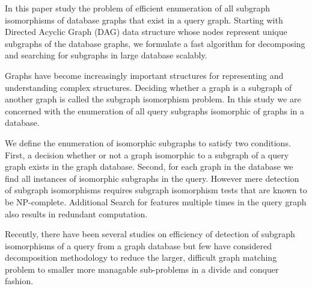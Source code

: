 
In this paper study the problem of efficient enumeration of all subgraph isomorphisms of database graphs that exist in a query graph. Starting with Directed Acyclic Graph (DAG) data structure whose nodes represent unique subgraphs of the database graphs, we formulate a fast algorithm for decomposing and searching for subgraphs in large database scalably.

Graphs have become increasingly important structures for representing and understanding complex structures. Deciding whether a graph is a subgraph of another graph is called the subgraph isomorphism problem. In this study we are concerned with the enumeration of all query subgraphs isomorphic of graphs in a database. 

We define the enumeration of isomorphic subgraphs to satisfy two conditions. First, a decision whether or not a graph isomorphic to a subgraph of a query graph exists in the graph database. Second, for each graph in the database we find all instances of isomorphic subgraphs in the query. 
However mere detection of subgraph isomorphisms requires subgraph isomorphism tests that are known to be NP-complete. Additional Search for features multiple times in the query graph also results in redundant computation.

Recently, there have been several studies on efficiency of detection of subgraph isomorphisms of a query from a graph database but few have considered decomposition methodology to reduce the larger, difficult graph matching problem to smaller more managable sub-problems in a divide and conquer fashion. 


